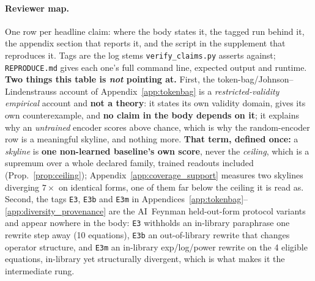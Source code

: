 \paragraph{Reviewer map.} One row per headline claim: where the body states it, the tagged run behind
it, the appendix section that reports it, and the script in the supplement that reproduces it. Tags
are the log stems \texttt{verify\_claims.py} asserts against; \texttt{REPRODUCE.md} gives each one's
full command line, expected output and runtime. \textbf{Two things this table is \emph{not} pointing
at.} First, the token-bag/Johnson--Lindenstrauss account of Appendix~\ref{app:tokenbag} is a
\emph{restricted-validity empirical} account and \textbf{not a theory}: it states its own validity
domain, gives its own counterexample, and \textbf{no claim in the body depends on it}; it explains
why an \emph{untrained} encoder scores above chance, which is why the random-encoder row is a
meaningful skyline, and nothing more. \textbf{That term, defined once:} a \emph{skyline} is \textbf{one
non-learned baseline's own score}, never the \emph{ceiling}, which is a supremum over a whole declared
family, trained readouts included (Prop.~\ref{prop:ceiling}); Appendix~\ref{app:coverage_support} measures
two skylines diverging $7\times$ on identical forms, one of them far below the ceiling it is read as. Second, the tags \texttt{E3}, \texttt{E3b} and \texttt{E3m} in
Appendices~\ref{app:tokenbag}--\ref{app:diversity_provenance} are the AI~Feynman held-out-form protocol variants and appear nowhere
in the body: \texttt{E3} withholds an in-library paraphrase one rewrite step away (10 equations),
\texttt{E3b} an out-of-library rewrite that changes operator structure, and \texttt{E3m} an in-library
exp/log/power rewrite on the 4 eligible equations, in-library yet structurally divergent, which is
what makes it the intermediate rung.

